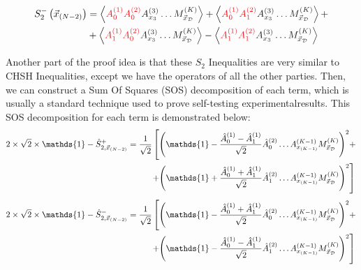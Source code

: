 \documentclass[12pt]{article}
\begin{document}
    \begin{equation*}
        \begin{aligned}
            {S}_{2}^{-} \left( {\vec{x}_{(N - 2)}} \right) & = \left\langle \color{Red} {A}_{0}^{(1)} {A}_{0}^{(2)} \color{Black} {A}_{{x}_{3}}^{(3)} \dots {M}_{{\vec{x}}_{\mathcal{D}}}^{(K)} \right\rangle + \left\langle \color{Red} {A}_{0}^{(1)} {A}_{1}^{(2)} \color{Black} {A}_{{x}_{3}}^{(3)} \dots {M}_{{\vec{x}}_{\mathcal{D}}}^{(K)} \right\rangle + \\
            & + \left\langle \color{Red} {A}_{1}^{(1)} {A}_{0}^{(2)} \color{Black} {A}_{{x}_{3}}^{(3)} \dots {M}_{{\vec{x}}_{\mathcal{D}}}^{(K)} \right\rangle - \left\langle \color{Red} {A}_{1}^{(1)} {A}_{1}^{(2)} \color{Black} {A}_{{x}_{3}}^{(3)} \dots {M}_{{\vec{x}}_{\mathcal{D}}}^{(K)} \right\rangle
        \end{aligned}
    \end{equation*}
    
    \noindent Another part of the proof idea is that these ${S}_{2}$ Inequalities are very similar to CHSH Inequalities, except we have the operators of all the other parties. Then, we can construct a Sum Of Squares (SOS) decomposition of each term, which is usually a standard technique used to prove self-testing experimental\break\clearpage\noindent results. This SOS decomposition for each term is demonstrated below:
    \begin{equation*}
        \begin{aligned}
            2 \times \sqrt{2} \times \mathds{1} - {\hat{S}}_{2,{\vec{x}_{(N - 2)}} }^{+} = \frac{1}{\sqrt{2}} & \left[ {\left( \mathds{1} - \frac{{\hat{A}}_{0}^{(1)} - {\hat{A}}_{1}^{(1)}}{\sqrt{2}} {\hat{A}}_{0}^{(2)} \dots {A}_{{x}_{(K - 1)}}^{(K - 1)} {M}_{{\vec{x}}_{\mathcal{D}}}^{(K)} \right)}^{2} + \right. \\
            & \left. \hspace{-0.5ex} + {\left( \mathds{1} + \frac{{\hat{A}}_{0}^{(1)} + {\hat{A}}_{1}^{(1)}}{\sqrt{2}} {\hat{A}}_{1}^{(2)} \dots {A}_{{x}_{(K - 1)}}^{(K - 1)} {M}_{{\vec{x}}_{\mathcal{D}}}^{(K)} \right)}^{2} \right]
        \end{aligned}
    \end{equation*}
    \begin{equation*}
        \begin{aligned}
            2 \times \sqrt{2} \times \mathds{1} - {\hat{S}}_{2,{\vec{x}_{(N - 2)}} }^{-} = \frac{1}{\sqrt{2}} & \left[ {\left( \mathds{1} - \frac{{\hat{A}}_{0}^{(1)} + {\hat{A}}_{1}^{(1)}}{\sqrt{2}} {\hat{A}}_{0}^{(2)} \dots {A}_{{x}_{(K - 1)}}^{(K - 1)} {M}_{{\vec{x}}_{\mathcal{D}}}^{(K)} \right)}^{2} + \right. \\
            & \left. \hspace{-0.5ex} + {\left( \mathds{1} - \frac{{\hat{A}}_{0}^{(1)} - {\hat{A}}_{1}^{(1)}}{\sqrt{2}} {\hat{A}}_{1}^{(2)} \dots {A}_{{x}_{(K - 1)}}^{(K - 1)} {M}_{{\vec{x}}_{\mathcal{D}}}^{(K)} \right)}^{2} \right]
        \end{aligned}
    \end{equation*}
    
\end{document}
